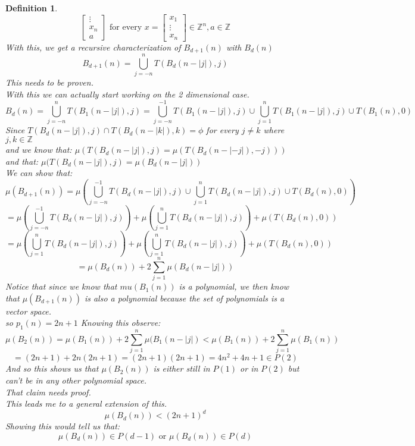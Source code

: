 \documentclass[12pt]{extarticle}
\theoremstyle{plain}
\theoremstyle{plain}
\theoremstyle{plain}
\theoremstyle{Definition}
\newtheorem{def.}{Definition}[section]
\theoremstyle{Definition}
\theoremstyle{plain}
\theoremstyle{plain}
\begin{document}
\begin{def.}
$$\begin{bmatrix}
	\vdots \\ 
	x_n \\ 
	a
	\end{bmatrix} \text{ for every } x = \begin{bmatrix}
	x_1 \\ 
	\vdots \\
	x_n
	\end{bmatrix} \in \mathbb{Z}^n, a \in \mathbb{Z}$$
	With this, we get a recursive characterization of $B_{d+1}(n)$ with  $B_{d}(n)$
	$$B_{d+1}(n) = \bigcup_{j=-n}^n T(B_{d}(n-|j|),j )$$
	This needs to be proven. \\ 
	With this we can actually start working on the 2 dimensional case. \\ 
	$$B_{d}(n) = \bigcup_{j=-n}^n T(B_{1}(n-|j|),j ) = \bigcup_{j=-n}^{-1} T(B_{1}(n-|j|),j ) \cup \bigcup_{j=1}^n T(B_{1}(n-|j|),j ) \cup T(B_{1}(n),0 )$$
	Since $T(B_{d}(n-|j|),j ) \cap T(B_{d}(n-|k|),k ) = \phi$ for every $j \not = k$ where $j,k \in \mathbb{Z}$ \\
	and we know that: $\mu(T(B_{d}(n-|j|),j) = \mu(T(B_{d}(n-|-j|),-j )))$ \\
	and that: $\mu(T(B_{d}(n-|j|),j) = \mu(B_{d}(n-|j|))$ \\
	We can show that: \\ 
	$$\mu(B_{d+1}(n))  = \mu\left( \bigcup_{j=-n}^{-1} T(B_{d}(n-|j|),j ) \cup \bigcup_{j=1}^n T(B_{d}(n-|j|),j ) \cup T(B_{d}(n),0 ) \right)$$
	$$= \mu\left( \bigcup_{j=-n}^{-1} T(B_{d}(n-|j|),j ) \right) + \mu\left( \bigcup_{j=1}^n T(B_{d}(n-|j|),j ) \right) + \mu\left(  T(B_{d}(n),0 ) \right)$$
	$$= \mu\left( \bigcup_{j=1}^{n} T(B_{d}(n-|j|),j ) \right) + \mu\left( \bigcup_{j=1}^n T(B_{d}(n-|j|),j ) \right) + \mu\left(  T(B_{d}(n),0 ) \right)$$
	$$ = \mu(B_d(n)) + 2 \sum_{j=1}^n \mu(B_{d}(n-|j|))$$
	Notice that since we know that $mu(B_1(n))$ is a polynomial, we then know that $\mu(B_{d+1}(n)) $ is also a polynomial because the set of polynomials is a vector space. \\
	so $p_1(n) = 2n + 1$
	Knowing this observe: \\ 
	$$\mu(B_{2}(n)) = \mu(B_1(n)) + 2 \sum_{j=1}^n \mu(B_{1}(n-|j|) < \mu(B_1(n)) + 2 \sum_{j=1}^n \mu(B_{1}(n)) $$
	$$= (2n+1) +  2n(2n+1)  = (2n+1)(2n+1) = 4n^2 + 4n + 1 \in P(2)$$
	And so this shows us that $\mu(B_{2}(n))$ is either still in $P(1)$ or in $P(2)$ but can't be in any other polynomial space. \\
	That claim needs proof. \\
	This leads me to a general extension of this. \\ 
	$$\mu(B_{d}(n)) < (2n+1)^d$$
	Showing this would tell us that: \\ 
	$$\mu(B_{d}(n)) \in P(d-1) \text{ or } \mu(B_{d}(n)) \in P(d)$$
\end{def.}
\end{document}
